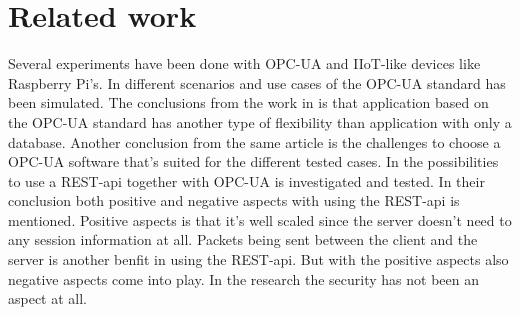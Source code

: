 \section{Related work}
Several experiments have been done with OPC-UA and IIoT-like devices like Raspberry Pi's. In \cite{opcUaArt} different scenarios and use cases of the OPC-UA standard has been simulated.
The conclusions from the work in \cite{opcUaArt} is that application based on the OPC-UA standard has another type of flexibility than application with only a database. Another conclusion from the same article is the challenges to choose a OPC-UA software that's suited for the different tested cases. In \cite{} the possibilities to use a REST-api together with OPC-UA is investigated and tested. In their conclusion both positive and negative aspects with using the REST-api is mentioned. Positive aspects is that it's well scaled since the server doesn't need to any session information at all. Packets being sent between the client and the server is another benfit in using the REST-api. But with the positive aspects also negative aspects come into play. In the research the security has not been an aspect at all.